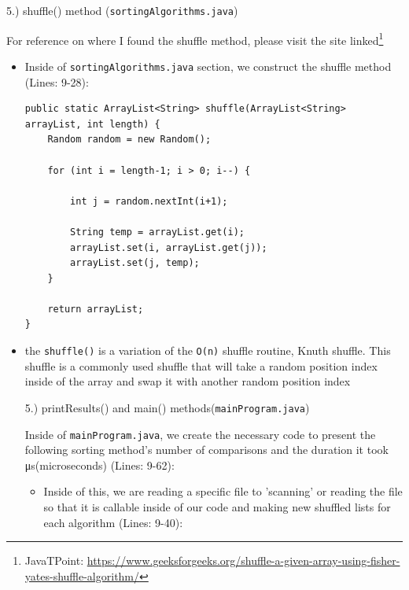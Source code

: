 \documentclass[a4paper,12pt]{article}
\begin{document}
\begin{large}
    5.) shuffle() method (\verb|sortingAlgorithms.java|)
\end{large}

\begin{footnotesize}
For reference on where I found the shuffle method, please visit the site linked\footnote{JavaTPoint: \url{https://www.geeksforgeeks.org/shuffle-a-given-array-using-fisher-yates-shuffle-algorithm/}} 
\end{footnotesize}

\begin{itemize}
\item Inside of \verb|sortingAlgorithms.java| section, we construct the shuffle method (Lines: 9-28):

\begin{verbatim}
public static ArrayList<String> shuffle(ArrayList<String> arrayList, int length) {
    Random random = new Random();

    for (int i = length-1; i > 0; i--) {
        
        int j = random.nextInt(i+1);
        
        String temp = arrayList.get(i);
        arrayList.set(i, arrayList.get(j));
        arrayList.set(j, temp);
    }
    
    return arrayList;
}
\end{verbatim}
\item the \verb|shuffle()| is a variation of the \verb|O(n)| shuffle routine, Knuth shuffle. This shuffle is a commonly used shuffle that will take a random position index inside of the array and swap it with another random position index\\


\begin{large}
    5.) printResults() and main() methods(\verb|mainProgram.java|)
\end{large}



Inside of \verb|mainProgram.java|, we create the necessary code to present the following sorting method's number of comparisons and the duration it took μs(microseconds) (Lines: 9-62):\\
\begin{itemize}
\item Inside of this, we are reading a specific file to 'scanning' or reading the file so that it is callable inside of our code and making new shuffled lists for each algorithm (Lines: 9-40):


\end{itemize}
\end{itemize}
\end{document}
